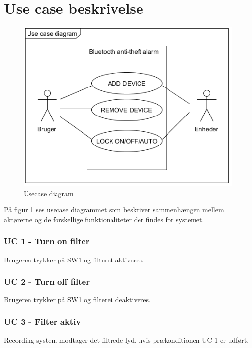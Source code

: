 \section{Use case beskrivelse}

\begin{figure}[H]
	\centering
	\includegraphics[width = 300 pt]{Img/Usecase_Diagram.png}
	\caption{Usecase diagram}
	\label{fig:Usecase diagram}
\end{figure}

På figur \ref{fig:Usecase diagram} ses usecase diagrammet som beskriver sammenhængen mellem aktørerne og de forskellige funktionaliteter der findes for systemet.

\subsubsection{UC 1 - Turn on filter}

Brugeren trykker på SW1 og filteret aktiveres. 


\subsubsection{UC 2 - Turn off filter}

Brugeren trykker på SW1 og filteret deaktiveres. 

\subsubsection{UC 3 - Filter aktiv}

Recording system modtager det filtrede lyd, hvis prækonditionen UC 1  er udført. 

\newpage
